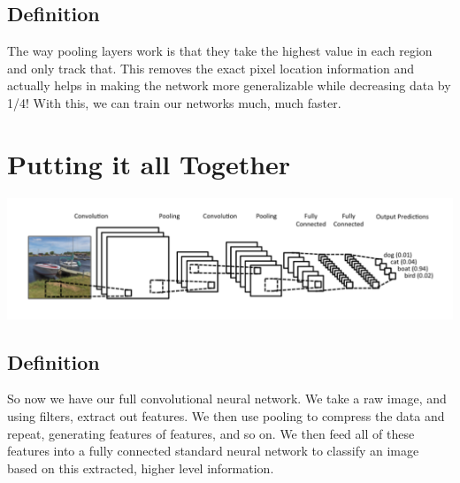 \documentclass{article}
\begin{document}
\subsection{Definition}
The way pooling layers work is that they take the highest value in each region and only track that. This removes the exact pixel location information and actually helps in making the network more generalizable while decreasing data by 1/4! With this, we can train our networks much, much faster.

\section{Putting it all Together}
\begin{center}
\includegraphics[scale=0.5]{fullstructure}
\end{center}
\subsection{Definition}
So now we have our full convolutional neural network. We take a raw image, and using filters, extract out features. We then use pooling to compress the data and repeat, generating features of features, and so on. We then feed all of these features into a fully connected standard neural network to classify an image based on this extracted, higher level information.
\end{document}

